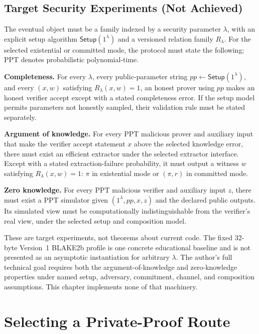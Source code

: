 \subsection{Target Security Experiments (Not Achieved)}
\label{sec:ttt-security-target}

The eventual object must be a family indexed by a security parameter
$\lambda$, with an explicit setup algorithm
$\mathsf{Setup}(1^\lambda)$ and a versioned relation family $R_\lambda$.
For the selected existential or committed mode, the protocol must state the
following; PPT denotes probabilistic polynomial-time.

\noindent\textbf{Completeness.}
For every $\lambda$, every public-parameter string
$\mathit{pp}\leftarrow\mathsf{Setup}(1^\lambda)$, and every $(x,w)$ satisfying
$R_\lambda(x,w)=1$, an honest prover using $\mathit{pp}$ makes an honest
verifier accept except with a stated completeness error. If the setup model
permits parameters not honestly sampled, their validation rule must be stated
separately.

\noindent\textbf{Argument of knowledge.}
For every PPT malicious prover and auxiliary input
that make the verifier accept statement $x$ above the selected knowledge error,
there must exist an efficient extractor under the selected extractor interface.
Except with a stated extraction-failure probability, it must output a witness
$w$ satisfying $R_\lambda(x,w)=1$: $\pi$ in existential mode or $(\pi,r)$ in
committed mode.

\noindent\textbf{Zero knowledge.}
For every PPT malicious verifier and auxiliary input $z$, there must exist a
PPT simulator given
$(1^\lambda,\mathit{pp},x,z)$ and the declared public outputs. Its simulated
view must be computationally indistinguishable from the verifier's real view,
under the selected setup and composition model.

These are target experiments, not theorems about current code. The fixed
32-byte Version~1 BLAKE2b profile is one concrete educational baseline and is
not presented as an asymptotic instantiation for arbitrary $\lambda$. The
author's full technical goal requires both the argument-of-knowledge and
zero-knowledge properties under named setup, adversary, commitment, channel,
and composition assumptions. This chapter implements none of that machinery.

\section{Selecting a Private-Proof Route}
\label{sec:ttt-proof-route}

